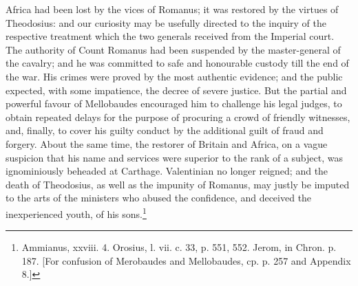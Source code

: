 Africa had been lost by the vices of Romanus; it was restored by the virtues of Theodosius: and our curiosity may be usefully directed to the inquiry of the respective treatment which the two generals received from the Imperial court. The authority of Count Romanus had been suspended by the master-general of the cavalry; and he was committed to safe and honourable custody till the end of the war. His crimes were proved by the most authentic evidence; and the public expected, with some impatience, the decree of severe justice. But the partial and powerful favour of Mellobaudes encouraged him to challenge his legal judges, to obtain repeated delays for the purpose of procuring a crowd of friendly witnesses, and, finally, to cover his guilty conduct by the additional guilt of fraud and forgery. About the same time, the restorer of Britain and Africa, on a vague suspicion that his name and services were superior to the rank of a subject, was ignominiously beheaded at Carthage. Valentinian no longer reigned; and the death of Theodosius, as well as the impunity of Romanus, may justly be imputed to the arts of the ministers who abused the confidence, and deceived the inexperienced youth, of his sons.\footnote{Ammianus, xxviii. 4. Orosius, l. vii. c. 33, p. 551, 552. Jerom, in Chron. p. 187. [For confusion of Merobaudes and Mellobaudes, cp. p. 257 and Appendix 8.]}

